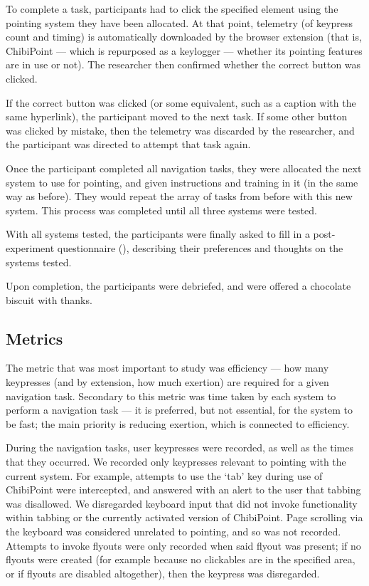 \documentclass[11pt,openright,a4paper]{report}
\begin{document}
To complete a task, participants had to click the specified element using the pointing system they have been allocated. At that point, telemetry (of keypress count and timing) is automatically downloaded by the browser extension (that is, ChibiPoint --- which is repurposed as a keylogger --- whether its pointing features are in use or not). The researcher then confirmed whether the correct button was clicked.

If the correct button was clicked (or some equivalent, such as a caption with the same hyperlink), the participant moved to the next task. If some other button was clicked by mistake, then the telemetry was discarded by the researcher, and the participant was directed to attempt that task again.

Once the participant completed all navigation tasks, they were allocated the next system to use for pointing, and given instructions and training in it (in the same way as before). They would repeat the array of tasks from before with this new system. This process was completed until all three systems were tested.

With all systems tested, the participants were finally asked to fill in a post-experiment questionnaire (), describing their preferences and thoughts on the systems tested.

Upon completion, the participants were debriefed, and were offered a chocolate biscuit with thanks.

\subsection{Metrics}
The metric that was most important to study was efficiency --- how many keypresses (and by extension, how much exertion) are required for a given navigation task. Secondary to this metric was time taken by each system to perform a navigation task --- it is preferred, but not essential, for the system to be fast; the main priority is reducing exertion, which is connected to efficiency.

During the navigation tasks, user keypresses were recorded, as well as the times that they occurred. We recorded only keypresses relevant to pointing with the current system. For example, attempts to use the `tab' key during use of ChibiPoint were intercepted, and answered with an alert to the user that tabbing was disallowed. We disregarded keyboard input that did not invoke functionality within tabbing or the currently activated version of ChibiPoint. Page scrolling via the keyboard was considered unrelated to pointing, and so was not recorded. Attempts to invoke flyouts were only recorded when said flyout was present; if no flyouts were created (for example because no clickables are in the specified area, or if flyouts are disabled altogether), then the keypress was disregarded.
\end{document}
